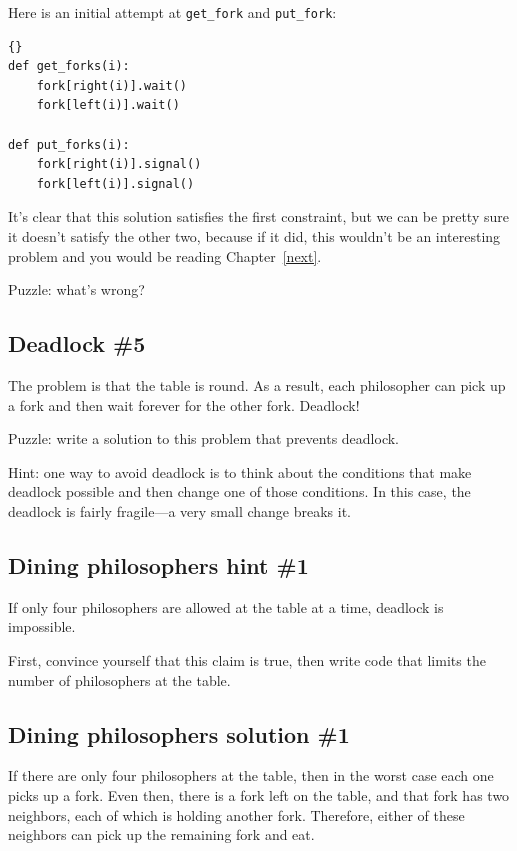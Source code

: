\documentclass{book}
\newcommand{\clearemptydoublepage}{\newpage\cleardoublepage}
\begin{document}
Here is an initial attempt at {\tt get\_fork} and {\tt put\_fork}:

\begin{lstlisting}[caption={Dining philosophers non-solution}]{}
def get_forks(i):
    fork[right(i)].wait()
    fork[left(i)].wait()

def put_forks(i):
    fork[right(i)].signal()
    fork[left(i)].signal()
\end{lstlisting}

It's clear that this solution satisfies the first constraint, but
we can be pretty sure it doesn't satisfy the other two, because
if it did, this wouldn't be an interesting problem and you would
be reading Chapter~\ref{next}.

Puzzle: what's wrong?


\clearemptydoublepage
\subsection{Deadlock \#5}

The problem is that the table is round.  As a result, each philosopher
can pick up a fork and then wait forever for the other fork.  Deadlock!

Puzzle: write a solution to this problem that prevents deadlock.

Hint: one way to avoid deadlock is to think about the conditions
that make deadlock possible and then change one of those conditions.
In this case, the deadlock is fairly fragile---a very small change
breaks it.

\clearemptydoublepage
\subsection{Dining philosophers hint \#1}

If only four philosophers are allowed at the table at a time,
deadlock is impossible.

First, convince yourself that this claim is true, then write code that
limits the number of philosophers at the table.


\clearemptydoublepage
\subsection{Dining philosophers solution \#1}

If there are only four philosophers at the table, then in the
worst case each one picks up a fork.  Even then, there is a fork
left on the table, and that fork has two neighbors, each of
which is holding another fork.  Therefore, either of these
neighbors can pick up the remaining fork and eat.
\end{document}

